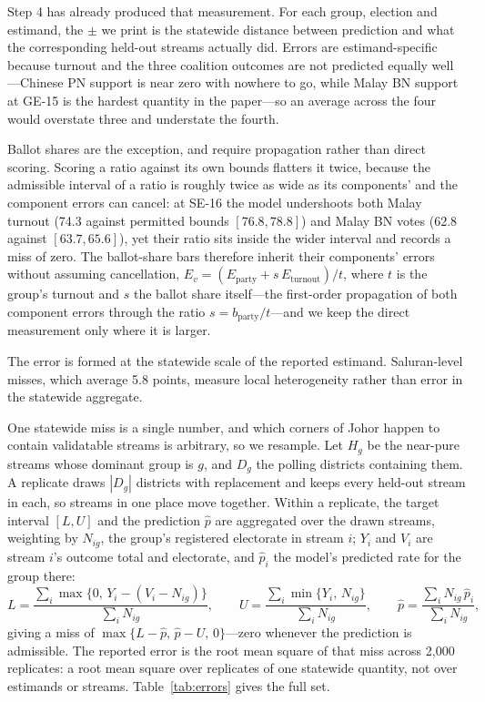 \documentclass[11pt]{article}
\begin{document}
Step 4 has already produced that measurement. For each group, election and estimand, the $\pm$ we print is the statewide distance between prediction and what the corresponding held-out streams actually did. Errors are estimand-specific because turnout and the three coalition outcomes are not predicted equally well---Chinese PN support is near zero with nowhere to go, while Malay BN support at GE-15 is the hardest quantity in the paper---so an average across the four would overstate three and understate the fourth.

Ballot shares are the exception, and require propagation rather than direct scoring. Scoring a ratio against its own bounds flatters it twice, because the admissible interval of a ratio is roughly twice as wide as its components' and the component errors can cancel: at SE-16 the model undershoots both Malay turnout (74.3 against permitted bounds $[76.8, 78.8]$) and Malay BN votes (62.8 against $[63.7, 65.6]$), yet their ratio sits inside the wider interval and records a miss of zero. The ballot-share bars therefore inherit their components' errors without assuming cancellation, $E_v = (E_{\text{party}} + s\,E_{\text{turnout}})/t$, where $t$ is the group's turnout and $s$ the ballot share itself---the first-order propagation of both component errors through the ratio $s = b_{\text{party}}/t$---and we keep the direct measurement only where it is larger.

The error is formed at the statewide scale of the reported estimand. Saluran-level misses, which average 5.8 points, measure local heterogeneity rather than error in the statewide aggregate.

One statewide miss is a single number, and which corners of Johor happen to contain validatable streams is arbitrary, so we resample. Let $H_g$ be the near-pure streams whose dominant group is $g$, and $D_g$ the polling districts containing them. A replicate draws $|D_g|$ districts with replacement and keeps every held-out stream in each, so streams in one place move together. Within a replicate, the target interval $[L, U]$ and the prediction $\hat p$ are aggregated over the drawn streams, weighting by $N_{ig}$, the group's registered electorate in stream $i$; $Y_i$ and $V_i$ are stream $i$'s outcome total and electorate, and $\hat p_i$ the model's predicted rate for the group there:
\begin{equation}
	L = \frac{\sum_i \max\{0,\, Y_i - (V_i - N_{ig})\}}{\sum_i N_{ig}}, \qquad
	U = \frac{\sum_i \min\{Y_i,\, N_{ig}\}}{\sum_i N_{ig}}, \qquad
	\hat p = \frac{\sum_i N_{ig}\, \hat p_i}{\sum_i N_{ig}},
	\label{eq:aggmiss}
\end{equation}
giving a miss of $\max\{L - \hat p,\, \hat p - U,\, 0\}$---zero whenever the prediction is admissible. The reported error is the root mean square of that miss across 2,000 replicates: a root mean square over replicates of one statewide quantity, not over estimands or streams. Table~\ref{tab:errors} gives the full set.
\end{document}

